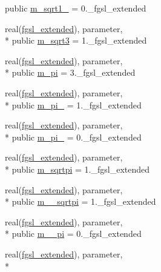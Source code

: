 \begin{DoxyCompactItemize}
public \hyperlink{classfgsl_aa15c7774ec8561b9221b81138e50d715}{m\-\_\-sqrt1\-\_} = 0.\-\_\-fgsl\-\_\-extended
\item 
real(\hyperlink{classfgsl_a9f38abe97062020e8a507aaa5bc683ab}{fgsl\-\_\-extended}), parameter, \\*
public \hyperlink{classfgsl_acdd93c47924b7382b9ab00728cc46b9f}{m\-\_\-sqrt3} = 1.\-\_\-fgsl\-\_\-extended
\item 
real(\hyperlink{classfgsl_a9f38abe97062020e8a507aaa5bc683ab}{fgsl\-\_\-extended}), parameter, \\*
public \hyperlink{classfgsl_a8af1e390793c77a120b600e4844495dc}{m\-\_\-pi} = 3.\-\_\-fgsl\-\_\-extended
\item 
real(\hyperlink{classfgsl_a9f38abe97062020e8a507aaa5bc683ab}{fgsl\-\_\-extended}), parameter, \\*
public \hyperlink{classfgsl_af8cd74655823aa30933d33b51ac35bbc}{m\-\_\-pi\-\_} = 1.\-\_\-fgsl\-\_\-extended
\item 
real(\hyperlink{classfgsl_a9f38abe97062020e8a507aaa5bc683ab}{fgsl\-\_\-extended}), parameter, \\*
public \hyperlink{classfgsl_ac72cdbd05abd60541bd253d571673cf4}{m\-\_\-pi\-\_} = 0.\-\_\-fgsl\-\_\-extended
\item 
real(\hyperlink{classfgsl_a9f38abe97062020e8a507aaa5bc683ab}{fgsl\-\_\-extended}), parameter, \\*
public \hyperlink{classfgsl_aa32be73a066aea0217a624284ae34c39}{m\-\_\-sqrtpi} = 1.\-\_\-fgsl\-\_\-extended
\item 
real(\hyperlink{classfgsl_a9f38abe97062020e8a507aaa5bc683ab}{fgsl\-\_\-extended}), parameter, \\*
public \hyperlink{classfgsl_a20272585dc8f0b54e493f4717330469a}{m\-\_\-\_\-sqrtpi} = 1.\-\_\-fgsl\-\_\-extended
\item 
real(\hyperlink{classfgsl_a9f38abe97062020e8a507aaa5bc683ab}{fgsl\-\_\-extended}), parameter, \\*
public \hyperlink{classfgsl_a10fdf50a29d35a63b13bc641ed465051}{m\-\_\-\_\-pi} = 0.\-\_\-fgsl\-\_\-extended
\item 
real(\hyperlink{classfgsl_a9f38abe97062020e8a507aaa5bc683ab}{fgsl\-\_\-extended}), parameter, \\*

\end{DoxyCompactItemize}
